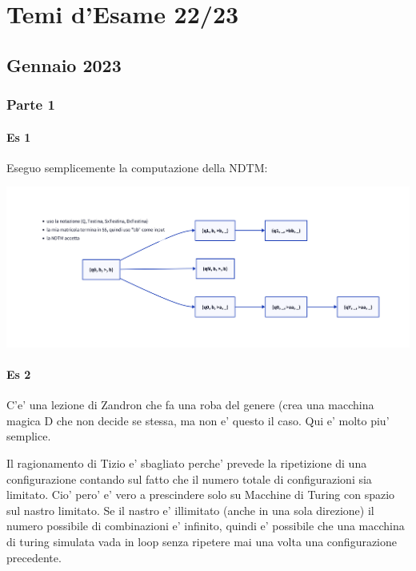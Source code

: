 \documentclass[a4paper,10pt,oneside]{book}
\begin{document}


\printindex
\tableofcontents

\part{Temi d'Esame 22/23}

\chapter{Gennaio 2023}

\section{Parte 1}

\subsection{Es 1}

Eseguo semplicemente la computazione della NDTM:

\begin{center}
    \includegraphics[width=1\linewidth]{Gennaio_01.png}
\end{center}

\subsection{Es 2}
\label{gennaio:1:2}

C'e' una lezione di Zandron che fa una roba del genere (crea una macchina magica D che non decide se stessa, ma non e' questo il caso. Qui e' molto piu' semplice.

Il ragionamento di Tizio e' sbagliato perche' prevede la ripetizione di una configurazione contando sul fatto che il numero totale di configurazioni sia limitato. Cio' pero' e' vero a prescindere solo su Macchine di Turing con spazio sul nastro limitato. Se il nastro e' illimitato (anche in una sola direzione) il numero possibile di combinazioni e' infinito, quindi e' possibile che una macchina di turing simulata vada in loop senza ripetere mai una volta una configurazione precedente.
\end{document}

